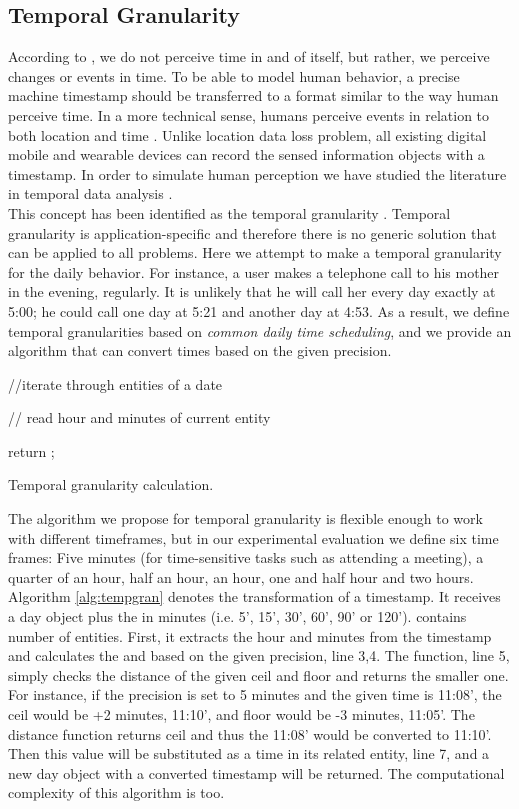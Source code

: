 \documentclass{sig-alternate}
\begin{document}
\subsection{Temporal Granularity}
According to \cite{time}, we do not perceive time in and of itself, but rather, we perceive changes or events in time. To be able to model human behavior, a precise machine timestamp should be transferred to a format similar to the way human perceive time. In a more technical sense, humans perceive events in relation to both location and time \cite{towsharing}. Unlike location data loss problem, all existing digital mobile and wearable devices can record the sensed information objects with a timestamp. In order to simulate human perception we have studied the literature in temporal data analysis \cite{encydb}. \\
This concept has been identified as the temporal granularity \cite{tempgran}. Temporal granularity is application-specific and therefore there is no generic solution that can be applied to all problems. Here we attempt to make a temporal granularity for the daily behavior. For instance, a user makes a telephone call to his mother in the evening, regularly. It is unlikely that he will call her every day exactly at 5:00; he could call  one day at 5:21 and another day at 4:53. As a result, we define temporal granularities based on \emph{common daily time scheduling}, and we provide an algorithm that can convert times based on the given precision. \\
\begin{algorithm2e}[h]
\scriptsize
 \KwData{, }
 \KwResult{ }
  //iterate through entities of a date \
   { 
    // read hour and minutes of current entity \\
	  \;
	  \;
	  \;
	  \;
	    	
   	}
  return ;
	\caption{\footnotesize Temporal granularity calculation.}\label{alg:tempgran}
\end{algorithm2e}
\normalsize
The algorithm we propose for temporal granularity is flexible enough to work with different timeframes, but in our experimental evaluation we define six time frames: Five minutes (for time-sensitive tasks such as attending a meeting), a quarter of an hour, half an hour, an hour, one and half hour and two hours. \\
Algorithm \ref{alg:tempgran} denotes the transformation of a timestamp. It receives a day object  plus the  in minutes (i.e. 5', 15', 30', 60', 90' or 120').  contains  number of entities. First, it extracts the hour and minutes from the timestamp and calculates the  and  based on the given precision, line 3,4. The  function, line 5, simply checks the distance of the given ceil and floor and returns the smaller one. For instance, if the precision is set to 5 minutes and the given time is 11:08', the ceil would be +2 minutes, 11:10', and floor would be -3 minutes, 11:05'. The distance function returns ceil and thus the 11:08'  would be converted to 11:10'. Then this value will be substituted as a time in its related entity, line 7, and a new day object with a converted timestamp will be returned. The computational complexity of this algorithm is  too.\\
\end{document}
